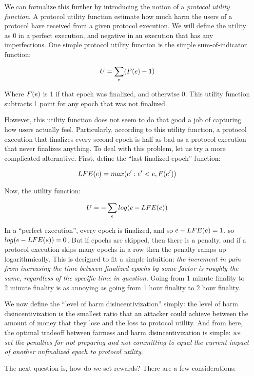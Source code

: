 \documentclass[12pt, final]{article}
\newcommand{\epoch}{\ensuremath{e}\space}
\begin{document}
We can formalize this further by introducing the notion of a \textit{protocol utility function}. A protocol utility function estimate how much harm the users of a protocol have received from a given protocol execution. We will define the utility as $0$ in a perfect execution, and negative in an execution that has any imperfections. One simple protocol utility function is the simple sum-of-indicator function:

$$U = \sum_{\epoch} (F(\epoch) - 1)$$

Where $F(\epoch)$ is 1 if that epoch was finalized, and otherwise 0. This utility function subtracts 1 point for any epoch that was not finalized.

However, this utility function does not seem to do that good a job of capturing how users actually feel. Particularly, according to this utility function, a protocol execution that finalizes every second epoch is half as bad as a protocol execution that never finalizes anything. To deal with this problem, let us try a more complicated alternative. First, define the ``last finalized epoch'' function:

$$LFE(\epoch) = max(\epoch': \epoch' < \epoch, F(\epoch'))$$

Now, the utility function:

$$U = -\sum_{\epoch} log(\epoch - LFE(\epoch))$$

In a ``perfect execution'', every epoch is finalized, and so $\epoch - LFE(\epoch) = 1$, so $log(\epoch - LFE(\epoch)) = 0$. But if epochs are skipped, then there is a penalty, and if a protocol execution skips many epochs in a row then the penalty ramps up logarithmically. This is designed to fit a simple intuition: \textit{the increment in pain from increasing the time between finalized epochs by some factor is roughly the same, regardless of the specific time in question}. Going from 1 minute finality to 2 minute finality is as annoying as going from 1 hour finality to 2 hour finality.

We now define the ``level of harm disincentivization'' simply: the level of harm disincentivization is the smallest ratio that an attacker could achieve between the amount of money that they lose and the loss to protocol utility. And from here, the optimal tradeoff between fairness and harm disincentivization is simple: \textit{we set the penalties for not preparing and not committing to equal the current impact of another unfinalized epoch to protocol utility}.

The next question is, how do we set rewards? There are a few considerations:
\end{document}
